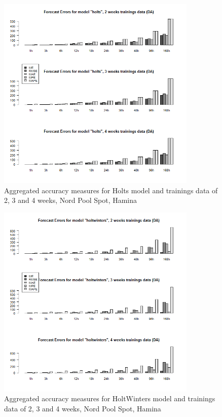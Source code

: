 \begin{figure}[!ht]
	\centering
		\includegraphics[width=0.85\textwidth]{figures/appendix_forecast_results/da_sim_1_x_1w_1w_holts.png}
	\caption{Aggregated accuracy measures for Holts model and trainings data of 2, 3 and 4 weeks, Nord
Pool Spot, Hamina}
	\label{fig:app_da_sim_1_x_1w_1w_holts}
	\vspace*{-1.6in}
\end{figure}




\begin{figure}[!ht]
	\centering
	\vspace*{-1.2in}
		\includegraphics[width=0.85\textwidth]{figures/appendix_forecast_results/da_sim_1_x_1w_1w_holtwinters.png}
	\caption{Aggregated accuracy measures for HoltWinters model and trainings data of 2, 3 and 4 weeks, Nord
Pool Spot, Hamina}
	\label{fig:app_da_sim_1_x_1w_1w_holtwinters}
\end{figure}

